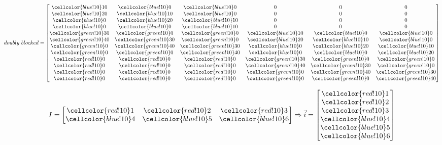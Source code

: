 \documentclass[11pt]{article}
\newcommand\x{\cellcolor{red!10}}
\newcommand\y{\cellcolor{green!10}}
\newcommand\z{\cellcolor{blue!10}}
\begin{document}
	\begin{equation}
	doubly \ blocked = 
	\begin{bmatrix}
	
	\z 10 & \z 0 & \z 0 & 0 & 0 & 0 \\
	\z 20 & \z 10 & \z 0 & 0 & 0 & 0 \\
	\z 0 & \z 20 & \z 10 & 0 & 0 & 0 \\
	\z 0 & \z 0 & \z 10  & 0 & 0 & 0 \\
	
	\y 30 & \y 0 & \y 0 & \z 10 & \z 0 & \z 0 \\
	\y 40 & \y 30 & \y 0 & \z 20 & \z 10 & \z 0 \\
	\y 0 & \y 40 & \y 30 & \z 0 & \z 20 & \z 10 \\
	\y 0 & \y 0 & \y 40  & \z 0 & \z 0 & \z 20  \\
	
	\x 0 & \x 0 & \x 0 &  \y 30 & \y 0 & \y 0 \\
	\x 0 & \x 0 & \x 0 & \y 40 & \y 30 & \y 0 \\
	\x 0 & \x 0 & \x 0 & \y 0 & \y 40 & \y 30 \\
	\x 0 & \x 0 & \x 0 & \y 0 & \y 0 & \y 40 \\
	
	\end{bmatrix}
	\end{equation}
	
	\begin{equation}
	I = 
	\begin{bmatrix}
	\x 1 & \x 2 & \x 3 \\
	\z 4 & \z 5 & \z 6 \\
	\end{bmatrix}
	\Rightarrow \vec{i} = 
	\begin{bmatrix}
	\x  1 \\ \x  2 \\ \x  3 \\ \z 4 \\ \z 5 \\ \z 6 
	\end{bmatrix}
	\end{equation}
	
\end{document}
